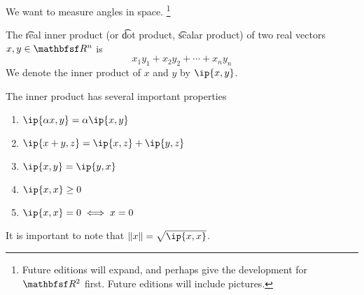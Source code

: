 
We want to measure angles in space.
  \ifhmode\unskip\fi\footnote{
Future editions will expand, and perhaps give the development for $\R ^2$ first.
Future editions will include pictures.
  }

The \t{real inner product} (or \t{dot product}, \t{scalar product}) of two real vectors $x, y \in \R ^n$ is
  \[
x_1y_1 + x_2y_2 + \cdots + x_ny_n
  \]
We denote the inner product of $x$ and $y$ by $\ip{x,y}$.

The inner product has several important properties
  \begin{enumerate}
  \item $\ip{\alpha x, y} = \alpha\ip{x, y}$
  \item $\ip{x + y, z} = \ip{x, z} + \ip{y, z}$
  \item $\ip{x, y} = \ip{y, x}$
  \item $\ip{x,x} \geq 0$
  \item $\ip{x,x} = 0 \iff x = 0$
  \end{enumerate}

It is important to note that $\norm{x} = \sqrt{\ip{x,x}}$.

\blankpage
